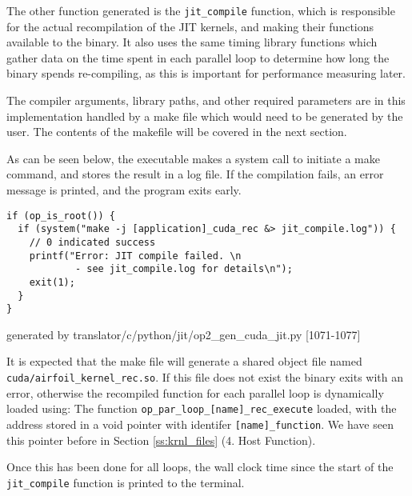 {
The other function generated is the \verb|jit_compile| function, which is responsible for the actual recompilation of the JIT kernels, and making their functions available to the binary. It also uses the same timing library functions which gather data on the time spent in each parallel loop to determine how long the binary spends re-compiling, as this is important for performance measuring later.
\par
The compiler arguments, library paths, and other required parameters are in this implementation handled by a make file which would need to be generated by the user. The contents of the makefile will be covered in the next section.
\par
As can be seen below, the executable makes a system call to initiate a make command, and stores the result in a log file. If the compilation fails, an error message is printed, and the program exits early.
\begin{lstlisting}[linewidth = \textwidth, framesep=0pt]
if (op_is_root()) {
  if (system("make -j [application]_cuda_rec &> jit_compile.log")) {
    // 0 indicated success
    printf("Error: JIT compile failed. \n
            - see jit_compile.log for details\n");
    exit(1);
  }
}
\end{lstlisting}
\vspace{-1em}
\hspace*{\fill}\footnotesize{generated by translator/c/python/jit/op2\_gen\_cuda\_jit.py [1071-1077]}

It is expected that the make file will generate a shared object file named \verb|cuda/airfoil_kernel_rec.so|. If this file does not exist the binary exits with an error, otherwise the recompiled function for each parallel loop is dynamically loaded using:
The function \verb|op_par_loop_[name]_rec_execute| loaded, with the address stored in a void pointer with identifer \verb|[name]_function|. We have seen this pointer before in Section \ref{ss:krnl_files} (4. Host Function).
\par
Once this has been done for all loops, the wall clock time since the start of the \verb|jit_compile| function is printed to the terminal.

}
